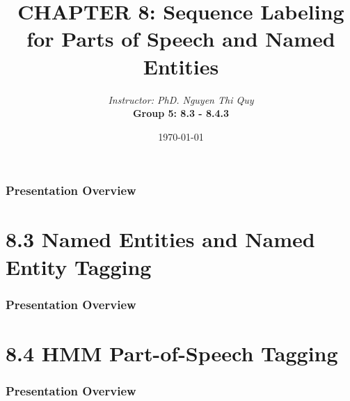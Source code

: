 \documentclass[13.5pt,aspecratio=169]{beamer}
\title{CHAPTER 8: Sequence Labeling for Parts of
Speech and Named Entities}
\author[Group 5]{\textit{Instructor: PhD. Nguyen Thi Quy}\\ \bigskip \textbf{Group 5: 8.3 - 8.4.3}}
\date{\today}
\begin{document}
\maketitle



\begin{frame}
    \doublespacing
        \frametitle{Presentation Overview} %
        
        \tableofcontents %
\end{frame}
    
    
    \section{8.3 Named Entities and Named Entity Tagging} %
    \begin{frame}
        \doublespacing
            \frametitle{Presentation Overview} %
            
            \tableofcontents[currentsection] %
    \end{frame}


\section{8.4 HMM Part-of-Speech Tagging} %
\begin{frame}
	\frametitle{Presentation Overview} %
	\tableofcontents[currentsection]
\end{frame}
\end{document}
